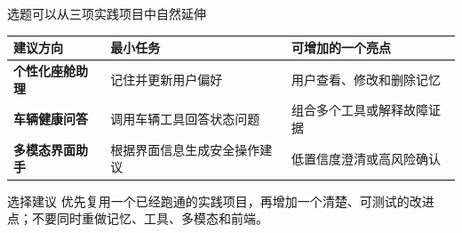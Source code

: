 \begin{frame}{选题可以从三项实践项目中自然延伸}
  \small
  \begin{tabularx}{\textwidth}{>{\bfseries}p{3.0cm} p{4.2cm} X}
    \toprule
    建议方向 & 最小任务 & 可增加的一个亮点 \\
    \midrule
    个性化座舱助理 & 记住并更新用户偏好 & 用户查看、修改和删除记忆 \\
    车辆健康问答 & 调用车辆工具回答状态问题 & 组合多个工具或解释故障证据 \\
    多模态界面助手 & 根据界面信息生成安全操作建议 & 低置信度澄清或高风险确认 \\
    \bottomrule
  \end{tabularx}
  \vspace{0.55em}
  \begin{block}{选择建议}
    优先复用一个已经跑通的实践项目，再增加一个清楚、可测试的改进点；不要同时重做记忆、工具、多模态和前端。
  \end{block}
\end{frame}


